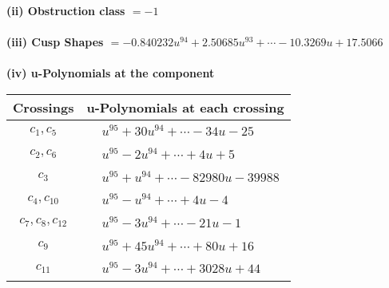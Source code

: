 \documentclass[1p]{elsarticle_modified}
\theoremstyle{definition}
\begin{document}
\flushleft \textbf{(ii) Obstruction class $= -1$}\\~\\
\flushleft \textbf{(iii) Cusp Shapes $= -0.840232 u^{94}+2.50685 u^{93}+\cdots-10.3269 u+17.5066$}\\~\\
\newpage\renewcommand{\arraystretch}{1}
\flushleft \textbf{(iv) u-Polynomials at the component}\newline \\
\begin{tabular}{m{50pt}|m{274pt}}
Crossings & \hspace{64pt}u-Polynomials at each crossing \\
\hline $$\begin{aligned}c_{1},c_{5}\end{aligned}$$&$\begin{aligned}
&u^{95}+30 u^{94}+\cdots-34 u-25
\end{aligned}$\\
\hline $$\begin{aligned}c_{2},c_{6}\end{aligned}$$&$\begin{aligned}
&u^{95}-2 u^{94}+\cdots+4 u+5
\end{aligned}$\\
\hline $$\begin{aligned}c_{3}\end{aligned}$$&$\begin{aligned}
&u^{95}+u^{94}+\cdots-82980 u-39988
\end{aligned}$\\
\hline $$\begin{aligned}c_{4},c_{10}\end{aligned}$$&$\begin{aligned}
&u^{95}- u^{94}+\cdots+4 u-4
\end{aligned}$\\
\hline $$\begin{aligned}c_{7},c_{8},c_{12}\end{aligned}$$&$\begin{aligned}
&u^{95}-3 u^{94}+\cdots-21 u-1
\end{aligned}$\\
\hline $$\begin{aligned}c_{9}\end{aligned}$$&$\begin{aligned}
&u^{95}+45 u^{94}+\cdots+80 u+16
\end{aligned}$\\
\hline $$\begin{aligned}c_{11}\end{aligned}$$&$\begin{aligned}
&u^{95}-3 u^{94}+\cdots+3028 u+44
\end{aligned}$\\
\hline
\end{tabular}\\~\\
\end{document}
